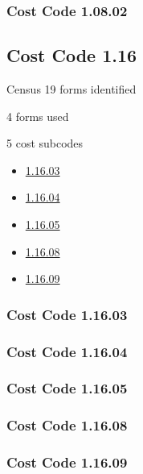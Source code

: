 \subsubsection{Cost Code 1.08.02}\hypertarget{sec:1.08.02}{}
	

\subsection{Cost Code 1.16}\hypertarget{sec:1.16}{}
\begin{frame}{Census}
  19 forms identified\par
  4 forms used\par
  5 cost subcodes\par
  \begin{itemize}
    \item \hyperlink{sec:1.16.03}{1.16.03}
    \item \hyperlink{sec:1.16.04}{1.16.04}
    \item \hyperlink{sec:1.16.05}{1.16.05}
    \item \hyperlink{sec:1.16.08}{1.16.08}
    \item \hyperlink{sec:1.16.09}{1.16.09}
  \end{itemize}
\end{frame}

\subsubsection{Cost Code 1.16.03}\hypertarget{sec:1.16.03}{}
	

\subsubsection{Cost Code 1.16.04}\hypertarget{sec:1.16.04}{}
	
	

\subsubsection{Cost Code 1.16.05}\hypertarget{sec:1.16.05}{}
	

\subsubsection{Cost Code 1.16.08}\hypertarget{sec:1.16.08}{}

\subsubsection{Cost Code 1.16.09}\hypertarget{sec:1.16.09}{}

\endinput  %
